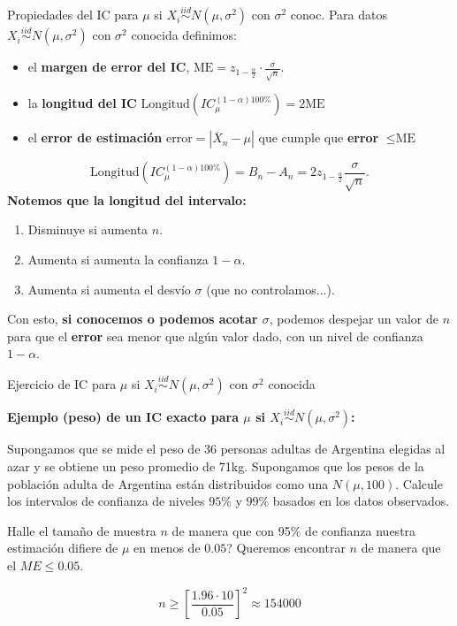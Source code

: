 \documentclass{beamer}
\theoremstyle{definition}
\begin{document}
\begin{frame}{\color{rosee}Propiedades del IC para $\mu$ si $X_i\stackrel{iid}{\sim}N(\mu,\sigma^2)$ con $\sigma^2$ conoc.} \small
Para datos $X_i\stackrel{iid}{\sim}N(\mu,\sigma^2)$ con $\sigma^2$ conocida definimos:
    \begin{itemize}
        
        \item el \textbf{margen de error del IC}, $\text{ME}=z_{1-\frac{\alpha}{2}}\cdot\frac{\sigma}{\sqrt{n}}$.
        \item la \textbf{longitud del IC} $\text{Longitud}\left(IC_{\mu}^{(1-\alpha)100\%}\right)=2\text{ME}$
        \item el \textbf{error de estimación} error$=|\overline{X}_{n}-\mu|$ que cumple que \textbf{error} $\leq \text{ME}$
    \end{itemize}

$$\text{Longitud}\left(IC_{\mu}^{(1-\alpha)100\%}\right) = B_n - A_n = 2z_{1-\frac{\alpha}{2}} \frac{\sigma}{\sqrt{n}}.$$
\textbf{Notemos que la longitud del intervalo:}
\begin{enumerate}
\item Disminuye si aumenta $n$.
\item Aumenta si aumenta la confianza $1-\alpha$.
\item Aumenta si aumenta el desvío $\sigma$ (que no controlamos...).
\end{enumerate}


    Con esto, \textbf{si conocemos o podemos acotar $\sigma$}, podemos despejar un valor de $n$ para que el \textbf{error} sea menor que algún valor dado, con un nivel de confianza $1-\alpha$.

\end{frame}


\begin{frame}{\color{rosee}Ejercicio de IC para $\mu$ si $X_i\stackrel{iid}{\sim}N(\mu,\sigma^2)$ con $\sigma^2$ conocida} 

  
\textbf{Ejemplo (peso) de un IC exacto para $\mu$ si $X_i\stackrel{iid}{\sim}N(\mu,\sigma^2)$:}

 Supongamos que se mide el peso de 36 personas adultas de Argentina elegidas al azar y se obtiene un peso promedio de 71kg. Supongamos que los pesos de la población adulta de Argentina están distribuidos como una $N(\mu,100)$. Calcule los intervalos de confianza de niveles $95\%$ y $99\%$ basados en los datos observados.
 
\bigskip


    Halle el tama\~no de muestra $n$ de manera que con 95\% de confianza  nuestra estimaci\'on difiere de $\mu$ en menos de $0.05$? \color{gray} Queremos encontrar $n$ de manera que el $ME\leq 0.05$.
    
    \[ n \geq  \left[ \frac{1.96 \cdot 10}{0.05} \right]^2\approx 154000 \]
  
\end{frame}
\end{document}
